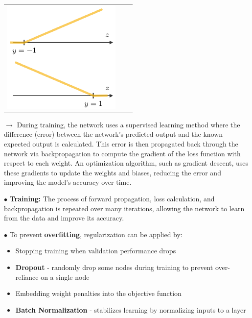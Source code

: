 \documentclass[letterpaper, 10.5pt,landscape]{article}
\begin{document}
\begin{multicols*}{3}
\begin{center}
\begin{tabular}{c|c|c}
            \includegraphics[scale = 0.4]{figures/hinge_loss_func.PNG}
    \end{tabular}
\end{center}



\vspace{2pt}
$\rightarrow$ During training, the network uses a supervised learning method where the difference (error) between the network's predicted output and the known expected output is calculated. This error is then propagated back through the network via backpropagation to compute the gradient of the loss function with respect to each weight. An optimization algorithm, such as gradient descent, uses these gradients to update the weights and biases, reducing the error and improving the model's accuracy over time.





\vspace{2pt}
$\bullet$ \textbf{Training:} The process of forward propagation, loss calculation, and backpropagation is repeated over many iterations, allowing the network to learn from the data and improve its accuracy.

$\bullet$ To prevent \textbf{overfitting}, regularization can be applied by:
\vspace{-3pt}
\begin{itemize}[label={--},leftmargin=6mm]
\itemsep -.4mm
\item Stopping training when validation performance drops
\item \textbf{Dropout} - randomly drop some nodes during training to prevent over-reliance on a single node
\item Embedding weight penalties into the objective function
\item \textbf{Batch Normalization} - stabilizes learning by normalizing inputs to a layer
\end{itemize}





\end{multicols*}
\end{document}
